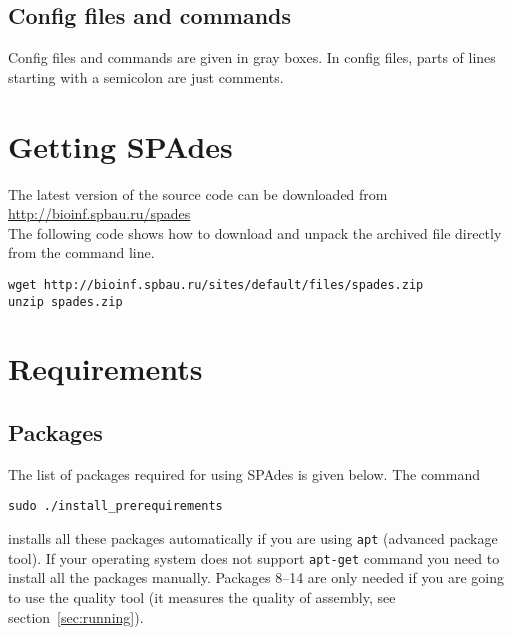 \documentclass{article}
\def\spades{SPAdes}
\begin{document}
\subsection{Config files and commands}
Config files and commands are given in gray boxes. 
In config files, parts of lines starting with a semicolon are just comments.


\section{Getting {\spades}}
The latest version of the source code can be downloaded from\\
\url{http://bioinf.spbau.ru/spades}\\
The following code shows how to download and unpack the archived file
directly from the command line.

\begin{lstlisting}
wget http://bioinf.spbau.ru/sites/default/files/spades.zip
unzip spades.zip
\end{lstlisting}

\section{Requirements}\label{section:requirements}
\subsection{Packages}\label{subsection:packages}
The list of packages required for using {\spades} is given below.
The command
\begin{lstlisting}
sudo ./install_prerequirements
\end{lstlisting}
installs all these packages automatically if you are using {\tt apt} (advanced package tool).
If your operating system does not support {\tt apt-get} command you
need to install all the packages manually. Packages 8--14 are only needed if you are going
to use the quality tool (it measures the quality of assembly, see section~\ref{sec:running}).
\end{document}
